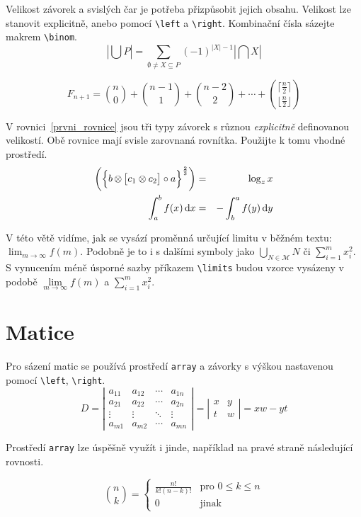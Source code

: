 \documentclass[a4paper, twocolumn, 11pt]{article}
\begin{document}
    \par
    Velikost závorek a svislých čar je potřeba přizpůsobit jejich obsahu. Velikost lze stanovit explicitně, anebo pomocí \verb|\left| a \verb|\right|. Kombinační čísla sázejte makrem \verb|\binom|.
    $$\left| \bigcup{P} \right| = \sum\limits _{\emptyset \neq X \subseteq P} (-1)^{|X| -1} \left| \bigcap{X} \right|$$ 
    
    $$ F_{n+1} = \binom{n}{0} + \binom{n-1}{1} + \binom{n-2}{2} + \cdots + \binom{\lceil {\frac{n}{2}}\rceil}{\lfloor {\frac{n}{2}}\rfloor}$$

    V rovnici~\eqref{prvni_rovnice} jsou tři typy závorek s různou \emph{explicitně} definovanou velikostí. Obě rovnice mají svisle zarovnaná rovnítka. Použijte k tomu vhodné prostředí.
    \begin{eqnarray} %
        \label{prvni_rovnice} 
        \biggl(\Bigl\{ b \, \otimes \, \bigr[ c_1 \otimes c_2 \bigr] \circ a \Bigl\}^{\frac{2}{3}} \biggl) & = & \log_z x \\
        \label{druha_rovnice}
        \int_a^b f(x)\,\mathrm{d}x & = & -\int_b^a f(y)\,\mathrm{d}y
    \end{eqnarray}

    \noindent V této větě vidíme, jak se vysází proměnná určující limitu v běžném textu: $\lim_{m\to\infty} f(m)$. Podobně je to i s dalšími symboly jako $\bigcup_{N \in \mathcal{M}}N$ či $\sum_{i=1}^{m} x^{2}_{i}$. S vynucením méně úsporné sazby příkazem \verb|\limits| budou vzorce vysázeny v podobě $\lim\limits_{m \to \infty}f(m)$ a $ \sum\limits _{i=1}^m x^{2}_{i}$. 

\section{Matice}
    Pro sázení matic se používá prostředí \verb|array| a závorky s výškou nastavenou pomocí \verb|\left|, \verb|\right|.
    $$ D =  \left|
        \begin{array}{cccc}
           a_{11}  &  a_{12} & \cdots & a_{1n}\\
           a_{21}  &  a_{22} & \cdots & a_{2n}\\
           \vdots  &  \vdots & \ddots & \vdots\\
           a_{m1}  &  a_{m2} & \cdots & a_{mn}
        \end{array}
    \right| = \left|
        \begin{array}{cc}
           x  & y \\
           t  & w
        \end{array}
    \right| = xw - yt $$

    \par
    Prostředí \verb|array| lze úspěšně využít i jinde, například na pravé straně následující rovnosti.

    $$ \binom{n}{k} =  \left\{
        \begin{array}{cl}
           \frac{n!}{k!(n-k)!} & \text{pro } 0 \leq k \leq n\\
            0                  & \text{jinak} 
        \end{array}
    \right.$$
\end{document}
